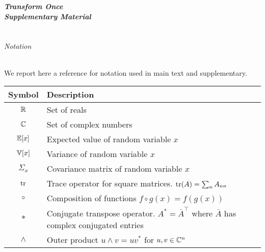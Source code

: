 
\newpage
%
\begin{center}
    \huge{\bf{\textit{Transform Once}} \\
    \emph{Supplementary Material}}
\end{center}
\vspace*{3mm}

\appendix
{}
\part{}
\parttoc

\paragraph{Notation}

We report here a reference for notation used in main text and supplementary.
\begin{table}[H]
    \centering
    \begin{tabular}{c|l}\toprule
        Symbol & Description \\\midrule
        $\mathbb{R}$ & Set of reals \\
        $\mathbb{C}$ & Set of complex numbers\\
        $\mathbb{E}[x]$ & Expected value of random variable $x$\\
        $\mathbb{V}[x]$ & Variance of random variable $x$\\
        $\Sigma_x$ & Covariance matrix of random variable $x$\\
        $\tr$ & Trace operator for square matrices. $\tr(A) = \sum_{n}A_{nn}$\\
        $\circ$ & Composition of functions $f\circ g(x) = f(g(x))$\\  
        $*$ & Conjugate transpose operator. $A^* = \bar A^\top$ where $\bar A$ has complex conjugated entries \\
        $\wedge$ & Outer product $u\wedge v = uv^*$ for $u,v\in\mathbb{C}^n$\\
        \bottomrule
    \end{tabular}
\end{table}

\clearpage





% 
% 